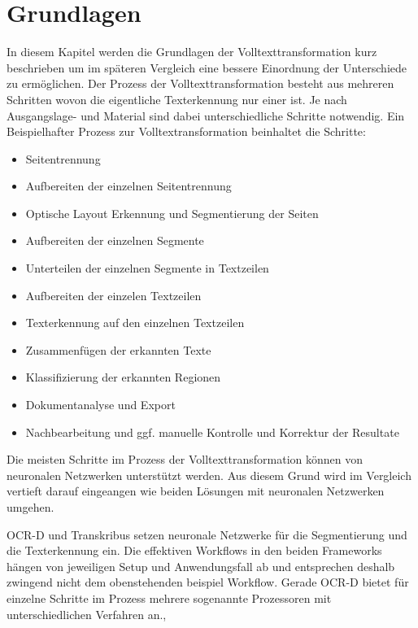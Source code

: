 \documentclass[a4paper,oneside, 12pt]{report}
\begin{document}
\chapter{Grundlagen}\label{sec:grundlagen}
In diesem Kapitel werden die Grundlagen der Volltexttransformation kurz beschrieben um im späteren Vergleich eine bessere Einordnung der Unterschiede zu ermöglichen. Der Prozess der Volltexttransformation besteht aus mehreren Schritten wovon die eigentliche Texterkennung nur einer ist. Je nach Ausgangslage- und Material sind dabei unterschiedliche Schritte notwendig. Ein Beispielhafter Prozess zur Volltextransformation beinhaltet die Schritte:
\begin{itemize}\itemsep=0.5pt
  \item Seitentrennung
  \item Aufbereiten der einzelnen Seitentrennung
  \item Optische Layout Erkennung und Segmentierung der Seiten
  \item Aufbereiten der einzelnen Segmente
  \item Unterteilen der einzelnen Segmente in Textzeilen
  \item Aufbereiten der einzelen Textzeilen
  \item Texterkennung auf den einzelnen Textzeilen
  \item Zusammenfügen der erkannten Texte
  \item Klassifizierung der erkannten Regionen
  \item Dokumentanalyse und Export
  \item Nachbearbeitung und ggf. manuelle Kontrolle und Korrektur der Resultate
\end{itemize}

Die meisten Schritte im Prozess der Volltexttransformation können von neuronalen Netzwerken unterstützt werden. Aus diesem Grund wird im Vergleich vertieft darauf eingeangen wie beiden Lösungen mit neuronalen Netzwerken umgehen. 

OCR-D und Transkribus setzen neuronale Netzwerke für die Segmentierung und die Texterkennung ein. Die effektiven Workflows in den beiden Frameworks hängen von jeweiligen Setup und Anwendungsfall ab und entsprechen deshalb zwingend nicht dem obenstehenden beispiel Workflow. Gerade OCR-D bietet für einzelne Schritte im Prozess mehrere sogenannte Prozessoren mit unterschiedlichen Verfahren an.\cite{transkribus}, \cite{ocrdworkflows} 
 
\end{document}
